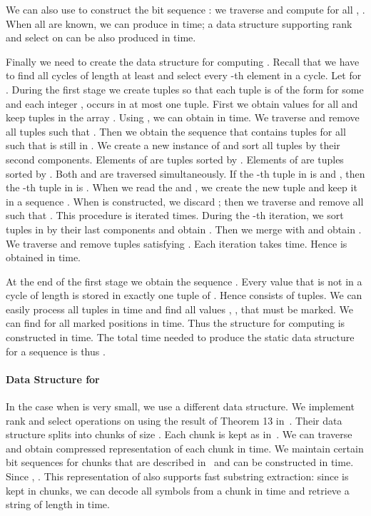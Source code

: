 \documentclass[11pt]{article}\usepackage{fullpage}
\begin{document}
We can also use  to construct the bit sequence : we traverse  and compute  for all , . When all  are known, we can produce  in  time; a data structure supporting rank and select on  can be also produced in  time. 

Finally we need to create the data structure for computing . Recall that we have to find all cycles of length at least  and select every -th element in a cycle. 
Let  for . During the first stage we create  tuples so that each tuple is of the form  for some  and each integer ,  occurs in at most one tuple. 
First we obtain values  for all  and keep tuples 
 in the array . Using , we can obtain  in  time. We traverse  and remove all tuples 
 such that . Then we obtain the sequence  
that contains tuples  for all  such that  
is still in . We create a new instance  of  and sort all tuples by their second components. Elements of  are tuples  sorted by . Elements of  are  tuples  sorted by . Both  and  are traversed simultaneously. 
If the -th tuple in  is  and , then the
-th tuple in  is . When we read the  and , we create the new tuple  and keep it in a sequence . When  is constructed, we discard ;
then we traverse  and remove all  such that 
. This procedure is iterated  times. During the -th iteration, we sort tuples in  by their last components and obtain . Then we merge  with  and obtain . 
We traverse  and remove tuples  satisfying 
. Each iteration takes  time. Hence  
is obtained in  time. 

 

At the end of the first stage we obtain the sequence . Every value 
 that is not in a cycle of length  is stored in exactly one tuple of . Hence  consists of  tuples. We can easily process all tuples in  time and find all values , , that 
must be marked. We can find  for all marked positions  in  time. Thus the structure for computing  is constructed in  time. The total time needed to produce the static data structure for a sequence  is thus .


\paragraph{Data Structure for }
In the case when  is very small, we use a different data structure. 
We implement rank and select operations on  using the result of Theorem 13 in~\cite{BN12}. Their data structure splits  into chunks of size . Each chunk is kept as in~\cite{RRR07}. We can traverse  and obtain compressed representation of each chunk in  time. We maintain certain bit sequences for chunks that are described in~\cite{BN12} and can be constructed in  time. Since , . This representation of  also supports fast substring extraction: since  is kept in chunks, we can decode all symbols from a chunk in  time and retrieve a string of length  in  time. 
\end{document}
